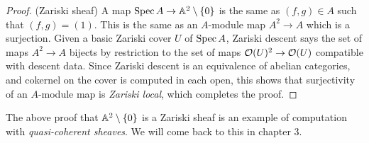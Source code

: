 \documentclass[./main.tex]{subfiles}
\begin{document}
\begin{proof}
  (Zariski sheaf) 
  A map $\operatorname{Spec} A \to \mathbb{A}^2\setminus\left\{0\right\}$
  is the same as $(f , g) \in A$ such that $(f , g) = (1)$.
  This is the same as an $A$-module map $A^2 \to A$ which is a surjection.
  Given a basic Zariski cover $U$ of $\operatorname{Spec} A$,
  Zariski descent says the set of maps $A^2 \to A$
  bijects by restriction to the set of maps $\mathcal{O}(U)^2 \to \mathcal{O}(U)$
  compatible with descent data.
  Since Zariski descent is an equivalence of abelian categories,
  and cokernel on the cover is computed in each open,
  this shows that surjectivity of an $A$-module map
  is \emph{Zariski local}, which completes the proof.
\end{proof}

The above proof that $\mathbb{A}^2\setminus\left\{0\right\}$ is a Zariski sheaf
is an example of computation with \emph{quasi-coherent sheaves}.
We will come back to this in chapter 3.

  
\end{document}
